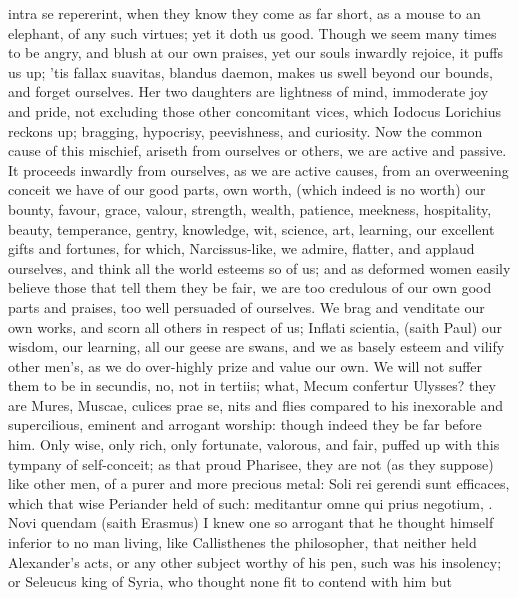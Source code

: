 {intra se repererint, when they know they come as far short, as a mouse
to an elephant, of any such virtues; yet it doth us good. Though we
seem many times to be angry,  and blush at our own praises, yet
our souls inwardly rejoice, it puffs us up; 'tis fallax suavitas,
blandus daemon, makes us swell beyond our bounds, and forget ourselves.
Her two daughters are lightness of mind, immoderate joy and pride, not
excluding those other concomitant vices, which Iodocus Lorichius
reckons up; bragging, hypocrisy, peevishness, and curiosity.
Now the common cause of this mischief, ariseth from ourselves or
others, we are active and passive. It proceeds inwardly from
ourselves, as we are active causes, from an overweening conceit we have
of our good parts, own worth, (which indeed is no worth) our bounty,
favour, grace, valour, strength, wealth, patience, meekness,
hospitality, beauty, temperance, gentry, knowledge, wit, science, art,
learning, our  excellent gifts and fortunes, for which,
Narcissus-like, we admire, flatter, and applaud ourselves, and think
all the world esteems so of us; and as deformed women easily believe
those that tell them they be fair, we are too credulous of our own good
parts and praises, too well persuaded of ourselves. We brag and
venditate our own works, and scorn all others in respect of us;
Inflati scientia, (saith Paul) our wisdom, our learning, all our
geese are swans, and we as basely esteem and vilify other men's, as we
do over-highly prize and value our own. We will not suffer them to be
in secundis, no, not in tertiis; what, Mecum confertur Ulysses? they
are Mures, Muscae, culices prae se, nits and flies compared to his
inexorable and supercilious, eminent and arrogant worship: though
indeed they be far before him. Only wise, only rich, only fortunate,
valorous, and fair, puffed up with this tympany of self-conceit;
as that proud Pharisee, they are not (as they suppose) like other
men, of a purer and more precious metal: Soli rei gerendi sunt
efficaces, which that wise Periander held of such: meditantur
omne qui prius negotium, \etc{}. Novi quendam (saith Erasmus) I knew
one so arrogant that he thought himself inferior to no man living, like
Callisthenes the philosopher, that neither held Alexander's acts,
or any other subject worthy of his pen, such was his insolency; or
Seleucus king of Syria, who thought none fit to contend with him but
}
